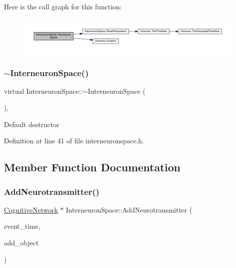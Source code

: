 Here is the call graph for this function\+:\nopagebreak
\begin{figure}[H]
\begin{center}
\leavevmode
\includegraphics[width=350pt]{class_interneuron_space_aa87eb8c7186542989fccdadc594c5915_cgraph}
\end{center}
\end{figure}
\mbox{\label{class_interneuron_space_aff0056e3c60b7eff3ad4ca12f6756628}} 
\subsubsection{\texorpdfstring{$\sim$\+Interneuron\+Space()}{~InterneuronSpace()}}
{\footnotesize\ttfamily virtual Interneuron\+Space\+::$\sim$\+Interneuron\+Space (\begin{DoxyParamCaption}{ }\end{DoxyParamCaption})\hspace{0.3cm}{\ttfamily [inline]}, {\ttfamily [virtual]}}

Default destructor 

Definition at line 41 of file interneuronspace.\+h.



\subsection{Member Function Documentation}
\mbox{\label{class_interneuron_space_afee7374310b2a8c08bac232d62ea7aa1}} 
\subsubsection{\texorpdfstring{Add\+Neurotransmitter()}{AddNeurotransmitter()}}
{\footnotesize\ttfamily \mbox{\hyperlink{class_cognitive_network}{Cognitive\+Network}} $\ast$ Interneuron\+Space\+::\+Add\+Neurotransmitter (\begin{DoxyParamCaption}\item[{std\+::chrono\+::time\+\_\+point$<$ \mbox{\hyperlink{universe_8h_a0ef8d951d1ca5ab3cfaf7ab4c7a6fd80}{Clock}} $>$}]{event\+\_\+time,  }\item[{\mbox{\hyperlink{class_cognitive_network}{Cognitive\+Network}} $\ast$}]{add\+\_\+object }\end{DoxyParamCaption})}



